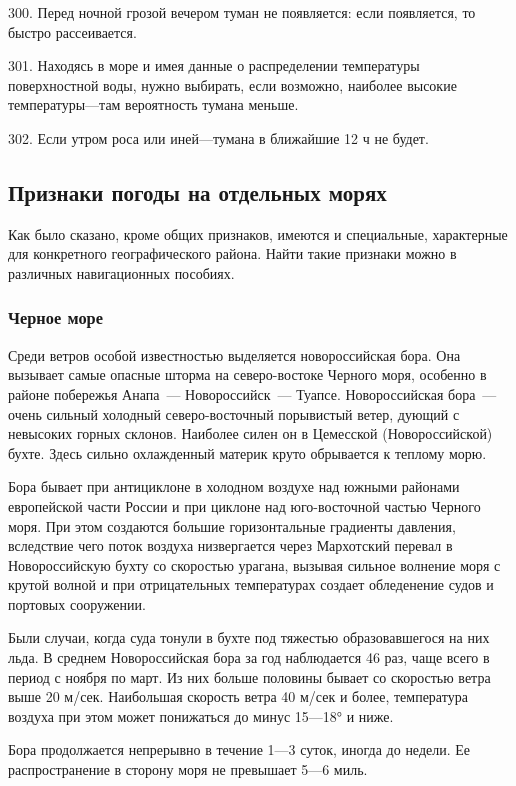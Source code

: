 300. Перед ночной грозой вечером туман не появляется: если появляется, то быстро рассеивается.

301. Находясь в море и имея данные о распределении температуры поверхностной воды, нужно выбирать, если возможно, наиболее высокие температуры—там вероятность тумана меньше.

302. Если утром роса или иней—тумана в ближайшие 12 ч не будет.

\subsection{Признаки погоды на отдельных морях}

Как было сказано, кроме общих признаков, имеются и специальные, характерные для конкретного географического района. Найти такие признаки можно в различных навигационных пособиях.

\subsubsection{Черное море}

Среди ветров особой известностью выделяется новороссийская бора. Она
вызывает самые опасные шторма на северо-востоке Черного моря, особенно
в районе побережья Анапа~--- Новороссийск~--- Туапсе. Новороссийская
бора~--- очень сильный холодный северо-восточный порывистый ветер,
дующий с невысоких горных склонов. Наиболее силен он в Цемесской
(Новороссийской) бухте. Здесь сильно охлажденный материк круто
обрывается к теплому морю.

Бора бывает при антициклоне в холодном воздухе над южными районами европейской части России и при циклоне над юго-восточной частью Черного моря. При этом создаются большие горизонтальные градиенты давления, вследствие чего поток воздуха низвергается через Мархотский перевал в Новороссийскую бухту со скоростью урагана, вызывая сильное волнение моря с крутой волной и при отрицательных температурах создает обледенение судов и портовых сооружении.

Были случаи, когда суда тонули в бухте под тяжестью образовавшегося на них льда. В среднем Новороссийская бора за год наблюдается 46 раз, чаще всего в период с ноября по март. Из них больше половины бывает со скоростью ветра выше 20 м/сек. Наибольшая скорость ветра 40 м/сек и более, температура воздуха при этом может понижаться до минус 15—18° и ниже.

Бора продолжается непрерывно в течение 1—3 суток, иногда до недели. Ее распространение в сторону моря не превышает 5—6 миль.

